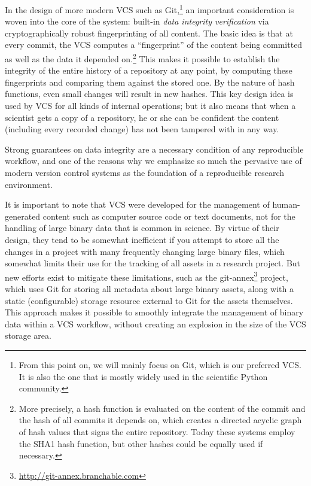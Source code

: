 \documentclass[11pt,oneside,english]{article}
\begin{document}
In the design of more modern VCS such as Git,\footnote{From this point on, we
will mainly focus on Git, which is our preferred VCS. It is also the one that
is mostly widely used in the scientific Python community.} an important
consideration is woven into the core of the system: built-in \emph{data
  integrity verification} via cryptographically robust fingerprinting of all
content.  The basic idea is that at every commit, the VCS computes a
``fingerprint'' of the content being committed as well as the data it depended
on.\footnote{More precisely, a hash function is evaluated on the content of the
  commit and the hash of all commits it depends on, which creates a directed
  acyclic graph of hash values that signs the entire repository.  Today these
  systems employ the SHA1 hash function, but other hashes could be equally used
  if necessary.}  This makes it possible to
establish the integrity of the entire history of a repository at any point, by
computing these fingerprints and comparing them against the stored one.  By the
nature of hash functions, even small changes will result in new hashes.
This key design idea is used by VCS for all kinds of internal
operations; but it also means that when a scientist gets a copy of a
repository, he or she can be confident the content (including every recorded
change) has not been tampered with in any way.

Strong guarantees on data integrity are a necessary condition of any
reproducible workflow, and one of the reasons why we emphasize so much the
pervasive use of modern version control systems as the foundation of a
reproducible research environment.

It is important to note that VCS were developed for the management of
human-generated content such as computer source code or text documents, not for
the handling of large binary data that is common in science.  By virtue of
their design, they tend to be somewhat inefficient if you attempt to store all
the changes in a project with many frequently changing large binary files,
which somewhat limits their use for the tracking of all assets in a research
project.  But new efforts exist to mitigate these limitations, such as the
git-annex\footnote{\url{http://git-annex.branchable.com}} project, which uses
Git for storing all metadata about large binary assets, along with a static
(configurable) storage resource external to Git for the assets themselves.
This approach makes it possible to smoothly integrate the management of binary
data within a VCS workflow, without creating an explosion in the size of the
VCS storage area.
\end{document}
